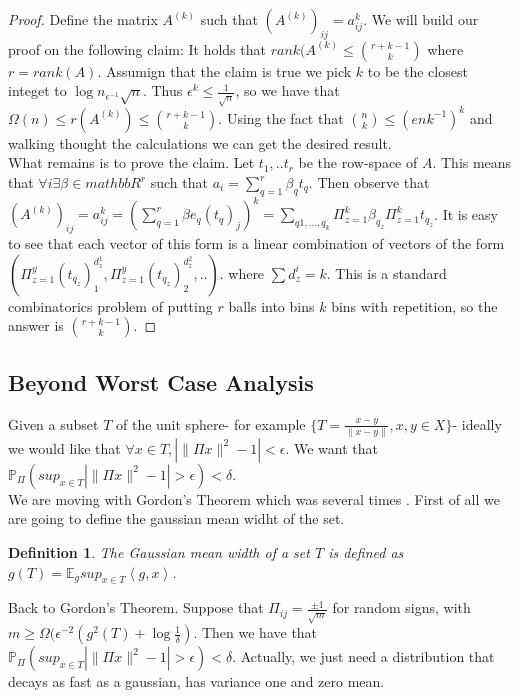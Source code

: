 \documentclass[11pt]{article}
\newcommand{\inprod}[1]{\left\langle #1 \right\rangle}
\newtheorem{definition}[theorem]{Definition}
\begin{document}
\begin{proof}

Define the matrix $A^{ (k) }$ such that $(A^{ (k) })_{ij} = a_{ij}^k$. We will build our proof on the following claim: It holds that $rank(A^{ (k) } \leq { r+k-1 \choose k}$ where $r=rank(A)$. Assumign that the claim is true we pick $k$ to be the closest integet to $\log n_{\epsilon^{-1}} \sqrt{n}$. Thus $\epsilon^k \leq \frac{1}{\sqrt{n}}$, so we have that $\Omega(n) \leq r(A^{ (k) }) \leq {r+k-1 \choose k}$. Using the fact that ${n \choose k} \leq (enk^{-1})^k$ and walking thought the calculations we can get the desired result.\\
What remains is to prove the claim. Let $t_1,..t_r$ be the row-space of $A$. This means that $\forall i \exists \beta \in mathbb{R}^r$ such that $a_i = \sum_{q=1}^r \beta_q t_q$. Then observe that  $(A^{ (k) })_{ij} = a_{ij}^k = (\sum_{q=1}^r \beta e_q (t_q)_j)^k = \sum_{q1,...,q_k} \Pi_{z=1}^k \beta_{q_z} \Pi_{z=1}^k t_{q_z}$. It is easy to see that each vector of this form is a linear combination of vectors of the form $(\Pi_{z=1}^y (t_{q_z})_1^{d_z^1},\Pi_{z=1}^y (t_{q_z})_2^{d_z^2},..)$. where $\sum d_z^i = k$. This is a standard combinatorics problem of putting $r$ balls into bins $k$ bins with repetition, so the answer is ${r+k-1 \choose k}$.


\end{proof} 

\subsection{Beyond Worst Case Analysis}


Given a subset $T$ of the unit sphere- for example $\{T = \frac{x-y}{\|x-y\|}, x,y \in X\}$- ideally we would like that $\forall x \in T, | \|\Pi x \|^2 -1| < \epsilon$. We want that $\mathbb{P}_{\Pi}( sup_{x\in T} | \|\Pi x \|^2 -1| > \epsilon  ) < \delta$.\\

We are moving with Gordon's Theorem \cite{Gordon} which was several times \cite{Klartag} \cite{Dirksen} \cite{Jagermann}. First of all we are going to define the gaussian mean widht of the set.
\begin{definition}
The Gaussian mean width of a set $T$ is defined as $g(T) = \mathbb{E}_g sup_{x \in T} \inprod{g,x}$.
\end{definition}
Back to Gordon's Theorem. Suppose that $\Pi_{ij} = \frac{\pm 1}{\sqrt{m}}$ for random signs, with $m \geq \Omega( \epsilon^{-2} ( g^2(T) + \log\frac{1}{\delta})$. Then we have that $\mathbb{P}_{\Pi}( sup_{x\in T} | \|\Pi x \|^2 -1| > \epsilon  ) < \delta$. Actually, we just need a distribution that decays as fast as a gaussian, has variance one and zero mean.\\
\end{document}
